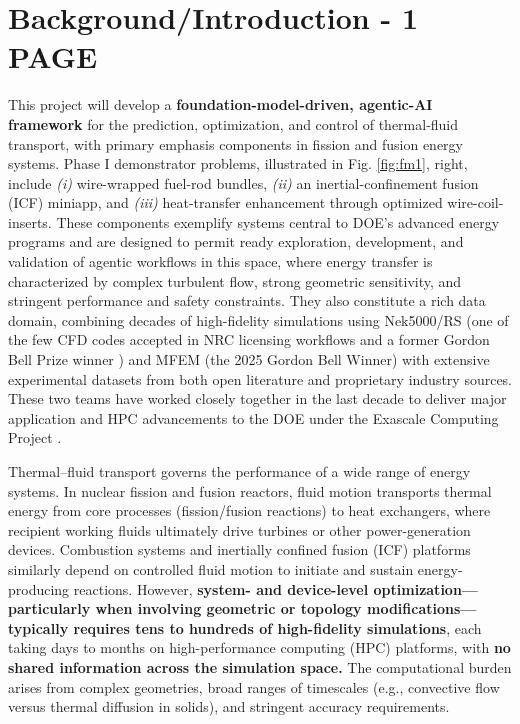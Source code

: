 \section{Background/Introduction  -   1 PAGE}

This project will develop a {\bf foundation-model-driven, agentic-AI framework}
\cite{Vinuesa2026XAI} for the prediction, optimization, and control of
thermal-fluid transport, with primary emphasis components in fission and fusion
energy systems.
  Phase I demonstrator problems, illustrated in Fig.  \ref{fig:fm1}, right, 
include 
{\em (i)} wire-wrapped fuel-rod bundles, 
{\em (ii)} an inertial-confinement fusion (ICF) miniapp, and 
{\em (iii)} heat-transfer enhancement through optimized wire-coil-inserts.
  These components exemplify systems central to DOE’s advanced energy
programs and are designed to permit ready exploration, development, and
validation of agentic workflows in this space, where
    energy transfer is characterized by complex turbulent flow, strong
geometric sensitivity, and stringent performance and safety constraints.
  They also constitute a rich data domain, combining decades of high-fidelity
simulations using Nek5000/RS (one of the few CFD codes accepted in NRC
licensing workflows and a former Gordon Bell Prize winner
\cite{tufo99a,gb23}) and MFEM (the 2025 Gordon Bell Winner) with extensive
experimental datasets from both open literature and proprietary industry sources.
  These two teams have worked closely together in the last decade to deliver
major application and HPC advancements to the DOE under the Exascale Computing
Project \cite{ceed}.





Thermal–fluid transport governs the performance of a wide range of energy systems.
In nuclear fission and fusion reactors, fluid motion transports thermal energy
from core processes (fission/fusion reactions) to heat exchangers, where 
recipient working fluids ultimately drive turbines or other power-generation devices.
Combustion systems and inertially confined fusion (ICF) platforms similarly
depend on controlled fluid motion to initiate and sustain energy-producing
reactions.
However, {\bf system- and device-level optimization—particularly when involving
geometric or topology modifications—typically requires tens to hundreds of
high-fidelity simulations}, each taking days to months on high-performance
computing (HPC) platforms,
with {\bf no shared information across the simulation space.} The computational
burden arises from complex geometries, broad ranges of timescales (e.g.,
convective flow versus thermal diffusion in solids), and stringent accuracy
requirements.

